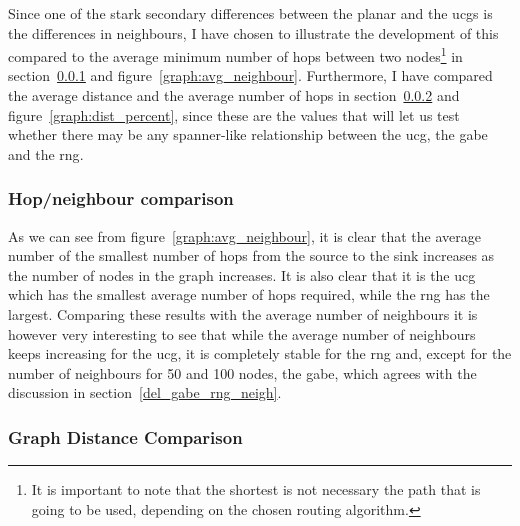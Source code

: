 Since one of the stark secondary differences between the planar and the \acp{ucg} is the differences in neighbours, I have chosen to illustrate the development of this compared to the average minimum number of hops between two nodes\footnote{It is important to note that the shortest is not necessary the path that is going to be used, depending on the chosen routing algorithm.} in section~\ref{section:hop_neighbour_comparison} and figure~\ref{graph:avg_neighbour}. Furthermore, I have compared the average distance and the average number of hops in section~\ref{section:graph_distance_comparison} and figure~\ref{graph:dist_percent}, since these are the values that will let us test whether there may be any spanner-like relationship between the \ac{ucg}, the \ac{gabe} and the \ac{rng}.

\subsubsection{Hop/neighbour comparison}
\label{section:hop_neighbour_comparison}

As we can see from figure~\ref{graph:avg_neighbour}, it is clear that the average number of the smallest number of hops from the source to the sink increases as the number of nodes in the graph increases. It is also clear that it is the \ac{ucg} which has the smallest average number of hops required, while the \ac{rng} has the largest. Comparing these results with the average number of neighbours it is however very interesting to see that while the average number of neighbours keeps increasing for the \ac{ucg}, it is completely stable for the \ac{rng} and, except for the number of neighbours for 50 and 100 nodes, the \ac{gabe}, which agrees with the discussion in section~\ref{del_gabe_rng_neigh}. 

\subsubsection{Graph Distance Comparison}
\label{section:graph_distance_comparison}


